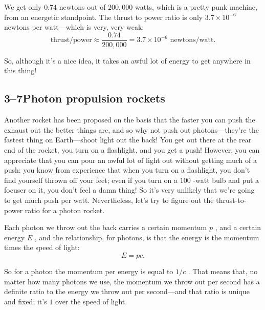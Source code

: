 \documentclass[11pt,oneside]{article}
\begin{document}
We get only \(0.74\) newtons out of \(200,\!000\) watts, which is a pretty punk machine, from an energetic standpoint. The thrust to power ratio is only \(3.7\times10^{-6}\) newtons per watt---which is very, very weak: 
\begin{equation*} \tag{3.27}
\label{Eq:TIPS:3:27} \text{thrust/power} \approx \frac{0.74}{200,\!000} = 3.7\times10^{-6}\text{ newtons/watt}. \end{equation*}
\par

So, although it's a nice idea, it takes an awful lot of energy to get anywhere in this thing!\par

\subsection*{3--7Photon propulsion rockets}

Another rocket has been proposed on the basis that the faster you can push the exhaust out the better things are, and so why not push out photons---they're the fastest thing on Earth---shoot light out the back! You get out there at the rear end of the rocket, you turn on a flashlight, and you get a push! However, you can appreciate that you can pour an awful lot of light out without getting much of a push: you know from experience that when you turn on a flashlight, you don't find yourself thrown off your feet; even if you turn on a \(100\) -watt bulb and put a focuser on it, you don't feel a damn thing! So it's very unlikely that we're going to get much push per watt. Nevertheless, let's try to figure out the thrust-to-power ratio for a photon rocket.\par

Each photon we throw out the back carries a certain momentum \(p\) , and a certain energy \(E\) , and the relationship, for photons, is that the energy is the momentum times the speed of light: 
\begin{equation*} \tag{3.28}
\label{Eq:TIPS:3:28} E = pc. \end{equation*}
\par

So for a photon the momentum per energy is equal to \(1/c\) . That means that, no matter how many photons we use, the momentum we throw out per second has a definite ratio to the energy we throw out per second---and that ratio is unique and fixed; it's \(1\) over the speed of light.\par
\end{document}
